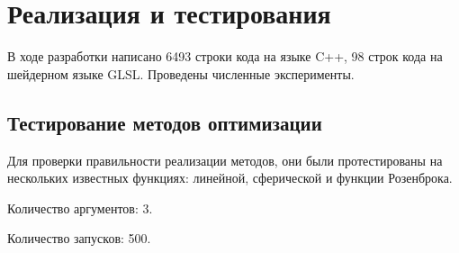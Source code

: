 \chapter{Реализация и тестирования}
\noindent\indent В ходе разработки написано 6493 строки кода на языке C++,
98 строк кода на шейдерном языке GLSL. Проведены численные эксперименты.
\section{Тестирование методов оптимизации}
\noindent Для проверки правильности реализации методов, они были протестированы на
нескольких известных функциях: линейной, сферической и функции Розенброка.\par
Количество аргументов: 3.\par
Количество запусков: 500.\par
\begin{table}[ht]
\centering
{}
\caption{Результаты тестирования алгоритмов оптимизации}
\end{table}\par
